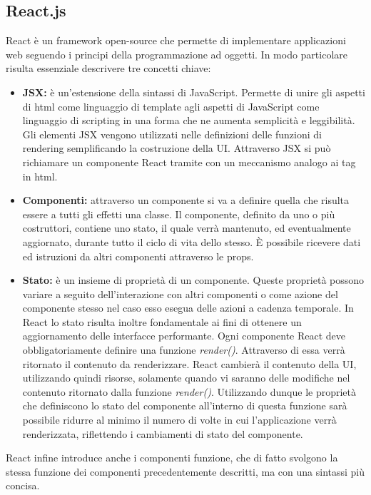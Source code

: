 \subsection{React.js}
React è un framework open-source che permette di implementare applicazioni web seguendo i principi della programmazione ad oggetti. In modo particolare risulta essenziale descrivere tre concetti chiave:
\begin{itemize}
    \item \textbf{JSX:} è un'estensione della sintassi di JavaScript.\cite{introduzione_jsx_react} Permette di unire gli aspetti di html come linguaggio di template agli aspetti di JavaScript come linguaggio di scripting in una forma che ne aumenta semplicità e leggibilità. Gli elementi JSX vengono utilizzati nelle definizioni delle funzioni di rendering semplificando la costruzione della UI. Attraverso JSX si può richiamare un componente React tramite con un meccanismo analogo ai tag in html.
    \item \textbf{Componenti:} attraverso un componente\cite{componente_react} si va a definire quella che risulta essere a tutti gli effetti una classe. Il componente, definito da uno o più costruttori, contiene uno stato, il quale verrà mantenuto, ed eventualmente aggiornato, durante tutto il ciclo di vita dello stesso. È possibile ricevere dati ed istruzioni da altri componenti attraverso le props.
    \item \textbf{Stato:} è un insieme di proprietà di un componente.\cite{state_e_lifecycle_react} Queste proprietà possono variare a seguito dell'interazione con altri componenti o come azione del componente stesso nel caso esso esegua delle azioni a cadenza temporale. In React lo stato risulta inoltre fondamentale ai fini di ottenere un aggiornamento delle interfacce performante. Ogni componente React deve obbligatoriamente definire una funzione \emph{render()}. Attraverso di essa verrà ritornato il contenuto da renderizzare. React cambierà il contenuto della UI, utilizzando quindi risorse, solamente quando vi saranno delle modifiche nel contenuto ritornato dalla funzione \emph{render()}. Utilizzando dunque le proprietà che definiscono lo stato del componente all'interno di questa funzione sarà possibile ridurre al minimo il numero di volte in cui l'applicazione verrà renderizzata, riflettendo i cambiamenti di stato del componente.    
\end{itemize}

React infine introduce anche i componenti funzione, che di fatto svolgono la stessa funzione dei componenti precedentemente descritti, ma con una sintassi più concisa.

